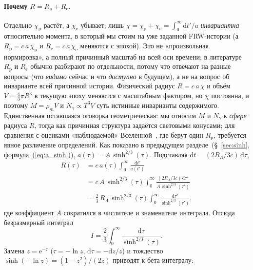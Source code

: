 \documentclass[12pt,a4paper]{article}
\begin{document}
\paragraph{Почему $R = R_{\mathrm{p}}+R_{\mathrm{e}}$.} Отдельно $\chi_{\mathrm{p}}$ растёт, а $\chi_{\mathrm{e}}$ убывает; лишь $\chi=\chi_{\mathrm{p}}+\chi_{\mathrm{e}}=\int_0^{\infty}\mathrm{d}t'/a$ \emph{инвариантна} относительно момента, в который мы стоим на уже заданной FRW-истории (а $R_{\mathrm{p}}=c\,a\,\chi_{\mathrm{p}}$ и $R_{\mathrm{e}}=c\,a\,\chi_{\mathrm{e}}$ меняются с эпохой). Это не «произвольная нормировка», а полный причинный масштаб на всей оси времени; в литературе~\cite{Davis2004} $R_{\mathrm{p}}$ и $R_{\mathrm{e}}$ обычно разбирают по отдельности, потому что отвечают на разные вопросы (что \emph{видимо} сейчас и что \emph{доступно} в будущем), а не на вопрос об инварианте всей причинной истории. Физический радиус $R=c\,a\,\chi$ и объём $V=\tfrac{4}{3}\pi R^3$ в текущую эпоху меняются с масштабным фактором, но $\chi$ постоянна, и поэтому $M=\rho_m V$ и $N_\gamma\propto T^3 V$ суть истинные инварианты содержимого. Единственная оставшаяся оговорка геометрическая: мы относим $M$ и $N_\gamma$ к \emph{сфере} радиуса $R$, тогда как причинная структура задаётся световыми конусами; для сравнения с оценками «наблюдаемой» Вселенной~\cite{EganLineweaver2010}, где берут один $R_{\mathrm{p}}$, требуется явное различение определений.
Как показано в предыдущем разделе~(\S~\ref{sec:sinh}, формула~(\ref{eq:a_sinh})), $a(\tau)=A\,\sinh^{2/3}(\tau)$. Подставляя $\mathrm{d}t=(2R_\Lambda/3c)\,\mathrm{d}\tau$,
\begin{equation}
\begin{aligned}
R(\tau) &= c\,a(\tau)\int_0^{\infty}\frac{\mathrm{d}t'}{a(t')} \\
&= c\,A\,\sinh^{2/3}(\tau)\int_0^{\infty}\frac{(2R_\Lambda/3c)\,\mathrm{d}\tau'}{A\,\sinh^{2/3}(\tau')} \\
&= \frac{2}{3}\,R_\Lambda\,\sinh^{2/3}(\tau)
   \int_0^{\infty}\frac{\mathrm{d}\tau'}{\sinh^{2/3}(\tau')},
\end{aligned}
\end{equation}
где коэффициент $A$ сократился в числителе и знаменателе интеграла. Отсюда безразмерный интеграл
\begin{equation}
I = \frac{2}{3}\int_0^{\infty}\frac{\mathrm{d}\tau}{\sinh^{2/3}(\tau)}.
\end{equation}
Замена $z=\mathrm{e}^{-\tau}$ ($\tau=-\ln z$, $\mathrm{d}\tau=-\mathrm{d}z/z$) и тождество $\sinh(-\ln z)=(1-z^2)/(2z)$ приводят к бета-интегралу:
\end{document}
